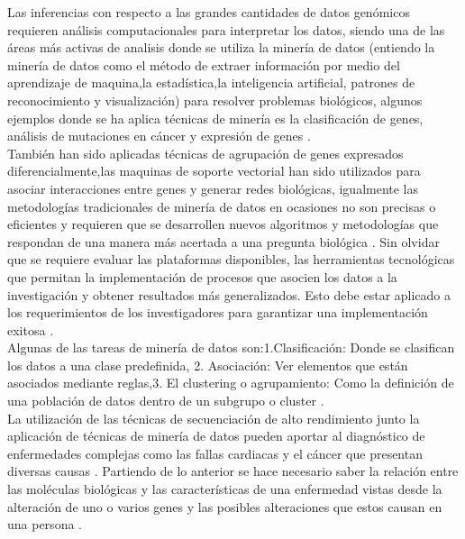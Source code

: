 {Las inferencias con respecto a las grandes cantidades de datos genómicos requieren análisis computacionales para interpretar los datos, siendo una de las áreas más activas de analisis donde se utiliza la minería de datos (entiendo la minería de datos como el método de extraer información por medio del aprendizaje de maquina,la estadística,la inteligencia artificial, patrones de reconocimiento y visualización) para resolver problemas biológicos, algunos ejemplos donde se ha aplica técnicas de minería es la clasificación de genes, análisis de mutaciones en cáncer y expresión de genes \cite{Littlefield}. \\

También han sido aplicadas técnicas de agrupación de genes expresados diferencialmente,las maquinas de soporte vectorial han sido utilizados para asociar interacciones entre genes y generar redes biológicas, igualmente las metodologías tradicionales de minería de datos en ocasiones no son precisas o eficientes y requieren que se desarrollen nuevos algoritmos y metodologías que respondan de una manera más acertada a una pregunta biológica \cite{Zaki2007}. Sin olvidar que se requiere evaluar las plataformas disponibles, las herramientas tecnológicas que permitan  la implementación de procesos que asocien los datos a  la investigación  y obtener resultados más generalizados.  Esto debe estar aplicado a los requerimientos de los investigadores para garantizar una implementación exitosa \cite{Bustos2007,Zaki2007}.\\

Algunas de las tareas de minería de datos son:1.Clasificación: Donde se clasifican los datos a una clase predefinida, 2. Asociación: Ver elementos que están asociados mediante reglas,3. El clustering o agrupamiento: Como la definición de una población de datos dentro de un subgrupo o cluster \cite{Littlefield}. \\

La utilización de las técnicas de secuenciación de alto rendimiento junto  la aplicación de técnicas de minería de datos pueden aportar al diagnóstico de enfermedades complejas  como las fallas cardiacas y el cáncer que presentan diversas causas \cite{Hannah-Shmouni2015} . Partiendo de lo anterior se hace necesario saber la relación entre las moléculas biológicas y las características de una enfermedad vistas desde la alteración de uno o varios genes y las posibles alteraciones que estos causan en una persona \cite{Li2014}.\\

}

